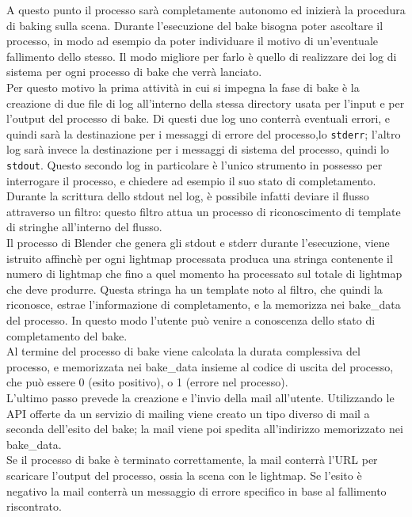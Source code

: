 A questo punto il processo sarà completamente autonomo ed inizierà la procedura di baking sulla scena. Durante l’esecuzione del bake bisogna poter ascoltare il processo, in modo ad esempio da poter individuare il motivo di un’eventuale fallimento dello stesso. Il modo migliore per farlo è quello di realizzare dei log di sistema per ogni processo di bake che verrà lanciato.
\\ 
Per questo motivo la prima attività in cui si impegna la fase di bake è la creazione di due file di log all’interno della stessa directory usata per l’input e per l’output del processo di bake. Di questi due log uno conterrà eventuali errori, e quindi sarà la destinazione per i messaggi di errore del processo,lo \texttt{stderr}; l’altro log sarà invece la destinazione per i messaggi di sistema del processo, quindi lo \texttt{stdout}. 
Questo secondo log in particolare è l’unico strumento in possesso per interrogare il processo, e chiedere ad esempio il suo stato di completamento. 
\\
Durante la scrittura dello stdout nel log, è possibile infatti deviare il flusso attraverso un filtro: questo filtro attua un processo di riconoscimento di template di stringhe all’interno del flusso.
\\ 
Il processo di Blender che genera gli stdout e stderr durante l’esecuzione, viene istruito affinchè per ogni lightmap processata produca una stringa contenente il numero di lightmap che fino a quel momento ha processato sul totale di lightmap che deve produrre. 
Questa stringa ha un template noto al filtro, che quindi la riconosce, estrae l’informazione di completamento, e la memorizza nei bake\_data del processo. In questo modo l’utente può venire a conoscenza dello stato di completamento del bake. 
\\
Al termine del processo di bake viene calcolata la durata complessiva del processo, e memorizzata nei bake\_data insieme al codice di uscita del processo, che può essere 0 (esito positivo), o 1 (errore nel processo).
\\ 
L'ultimo passo prevede la creazione e l'invio della mail all'utente. Utilizzando le API offerte da un servizio di mailing viene creato un tipo diverso di mail a seconda dell’esito del bake; la mail viene poi spedita all’indirizzo memorizzato nei bake\_data. 
\\
Se il processo di bake è terminato correttamente, la mail conterrà l’URL per scaricare l'output del processo, ossia la scena con le lightmap. Se l’esito è negativo la mail conterrà un messaggio di errore specifico in base al fallimento riscontrato.
